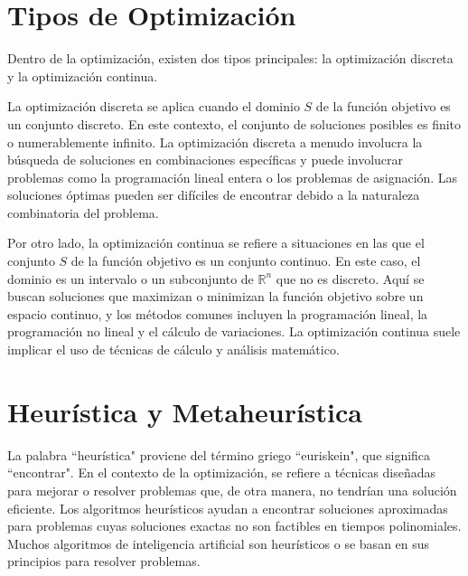 \documentclass[12pt,titlepage,twoside,openright]{book}
\begin{document}
\section{Tipos de Optimizaci\'on}

Dentro de la optimizaci\'on, existen dos tipos principales: la optimizaci\'on discreta y la optimizaci\'on continua.

La optimizaci\'on discreta se aplica cuando el dominio \( S \) de la funci\'on objetivo es un conjunto discreto. En este contexto, el conjunto de soluciones posibles es finito o numerablemente infinito. La optimizaci\'on discreta a menudo involucra la b\'usqueda de soluciones en combinaciones espec\'ificas y puede involucrar problemas como la programaci\'on lineal entera o los problemas de asignaci\'on. Las soluciones \'optimas pueden ser dif\'iciles de encontrar debido a la naturaleza combinatoria del problema.

Por otro lado, la optimizaci\'on continua se refiere a situaciones en las que el conjunto \( S \) de la funci\'on objetivo es un conjunto continuo. En este caso, el dominio es un intervalo o un subconjunto de \( \mathbb{R}^n \) que no es discreto. Aqu\'i se buscan soluciones que maximizan o minimizan la funci\'on objetivo sobre un espacio continuo, y los m\'etodos comunes incluyen la programaci\'on lineal, la programaci\'on no lineal y el c\'alculo de variaciones. La optimizaci\'on continua suele implicar el uso de t\'ecnicas de c\'alculo y an\'alisis matem\'atico.



\section{Heur\'istica y Metaheur\'istica}

La palabra ``heur\'istica" proviene del t\'ermino griego ``euriskein", que significa ``encontrar".
En el contexto de la optimizaci\'on, se refiere a t\'ecnicas dise\~nadas para mejorar o resolver problemas que, de otra manera, no tendr\'ian una soluci\'on eficiente. Los algoritmos heur\'isticos ayudan a encontrar soluciones aproximadas para problemas cuyas soluciones exactas no son factibles en tiempos polinomiales.
Muchos algoritmos de inteligencia artificial son heur\'isticos o se basan en sus principios para resolver problemas.
\end{document}
